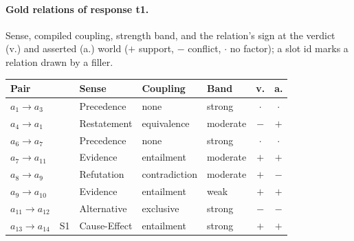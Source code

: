 \paragraph{Gold relations of response t1.} Sense, compiled coupling, strength band, and the relation's sign at the verdict (v.) and asserted (a.) world ($+$ support, $-$ conflict, $\cdot$ no factor); a slot id marks a relation drawn by a filler.

\begin{center}\scriptsize
\setlength{\tabcolsep}{2.2pt}
\begin{tabular}{@{}lllllcc@{}}
\toprule
Pair & & Sense & Coupling & Band & v. & a. \\
\midrule
$a_{1}\to a_{3}$ &  & Precedence & none & strong & $\cdot$ & $\cdot$ \\
$a_{4}\to a_{1}$ &  & Restatement & equivalence & moderate & $-$ & $+$ \\
$a_{6}\to a_{7}$ &  & Precedence & none & strong & $\cdot$ & $\cdot$ \\
$a_{7}\to a_{11}$ &  & Evidence & entailment & moderate & $+$ & $+$ \\
$a_{8}\to a_{9}$ &  & Refutation & contradiction & moderate & $+$ & $-$ \\
$a_{9}\to a_{10}$ &  & Evidence & entailment & weak & $+$ & $+$ \\
$a_{11}\to a_{12}$ &  & Alternative & exclusive & strong & $-$ & $-$ \\
$a_{13}\to a_{14}$ & S1 & Cause-Effect & entailment & strong & $+$ & $+$ \\
\bottomrule
\end{tabular}
\end{center}
